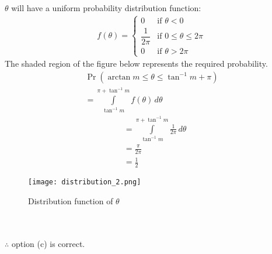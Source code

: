 \documentclass[journal,12pt,twocolumn]{IEEEtran}
\providecommand{\pr}[1]{\ensuremath{\Pr\left(#1\right)}}
\theoremstyle{remark}
\numberwithin{equation}{subsection}
\begin{document}
$\theta$ will have a uniform probability distribution function: 
\begin{align}
    f(\theta)=\nonumber
    \begin{cases}
    0 &\text{if } \theta<0\\
    \dfrac{1}{2\pi} & \text{if } 0\leq\theta\leq2\pi\\
    0 &\text{if } \theta>2\pi
    \end{cases}
\end{align}
The shaded region of the figure below represents the required probability. 
\begin{align}
    \pr{\arctan m\leq\theta\leq\tan^{-1} m +\pi}\nonumber\\
    =\displaystyle\int\limits_{\tan^{-1} m}^{\pi + \tan^{-1} m} f(\theta) \,d\theta
\end{align}
\begin{align}
    &=\displaystyle\int\limits_{\tan^{-1} m}^{\pi + \tan^{-1} m} \frac{1}{2\pi} \,d\theta\\
    &=\frac{\pi}{2\pi}\\
    &=\frac{1}{2}
\end{align}
\begin{figure}[h!]
    \centering
    \texttt{[image: distribution\_2.png]}
    \caption{Distribution function of $\theta$}
    \label{fig:my_label}
\end{figure}\\
\\ $\therefore$ option (c) is correct.
\end{document}
